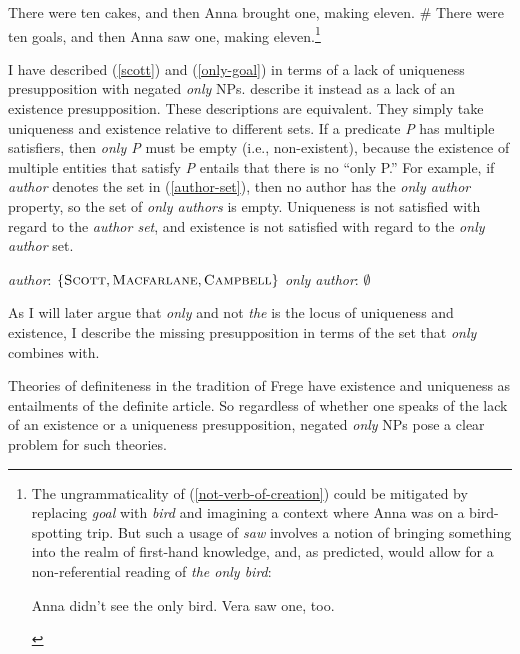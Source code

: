 \begin{exe}
	\ex \label{verb-of-creation} There were ten cakes, and then Anna brought one, making eleven.
	\ex \label{not-verb-of-creation} \# There were ten goals, and then Anna saw one, making eleven.\footnote{The ungrammaticality of (\ref{not-verb-of-creation}) could be mitigated by replacing \textit{goal} with \textit{bird} and imagining a context where Anna was on a bird-spotting trip. But such a usage of \textit{saw} involves a notion of bringing something into the realm of first-hand knowledge, and, as predicted, would allow for a non-referential reading of \textit{the only bird}: \begin{exe} \ex Anna didn't see the only bird. Vera saw one, too. \end{exe} }
\end{exe}

I have described (\ref{scott}) and (\ref{only-goal}) in terms of a lack of uniqueness presupposition with negated \textit{only} NPs. \citet{cb2015} describe it instead as a lack of an existence presupposition. These descriptions are equivalent. They simply take uniqueness and existence relative to different sets. If a predicate \textit{P} has multiple satisfiers, then \textit{only P} must be empty (i.e., non-existent), because the existence of multiple entities that satisfy \textit{P} entails that there is no ``only P.'' For example, if \textit{author} denotes the set in (\ref{author-set}), then no author has the \textit{only author} property, so the set of \textit{only authors} is empty. Uniqueness is not satisfied with regard to the \textit{author set}, and existence is not satisfied with regard to the \textit{only author} set.

\begin{exe}
	\ex \label{author-set} \textit{author}: $\lbrace \textsc{Scott}, \textsc{Macfarlane}, \textsc{Campbell} \rbrace$
	\ex \textit{only author}: $\emptyset$
\end{exe}

As I will later argue that \textit{only} and not \textit{the} is the locus of uniqueness and existence, I describe the missing presupposition in terms of the set that \textit{only} combines with.

Theories of definiteness in the tradition of Frege have existence and uniqueness as entailments of the definite article. So regardless of whether one speaks of the lack of an existence or a uniqueness presupposition, negated \textit{only} NPs pose a clear problem for such theories.